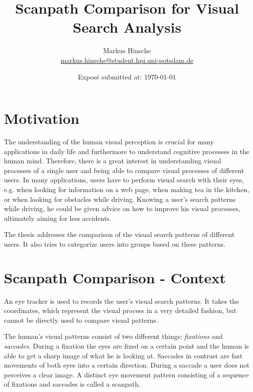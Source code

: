 \documentclass[
        a4paper,     %
        parskip      %
        ]{scrartcl} %
\title{Scanpath Comparison for Visual Search Analysis}
\author{Markus Hinsche\\{\small{\url{markus.hinsche@student.hpi.uni-potsdam.de}}}}
\date{Exposé submitted at: \today}
\begin{document}
  \maketitle    %

\newcommand{\itemsepsize}{-10pt}

  \section{Motivation}

The understanding of the human visual perception is crucial for many applications in daily life and furthermore to understand cognitive processes in the human mind. 
Therefore, there is a great interest in understanding visual processes of a single user and being able to compare visual processes of different users. 
In many applications, users have to perform visual search with their eyes, e.g. when looking for information on a web page, when making tea in the kitchen, or when looking for obstacles while driving. 
Knowing a user's search patterns while driving, he could be given advice on how to improve his visual processes, ultimately aiming for less accidents. 
        
The thesis addresses the comparison of the visual search patterns of different users. It also tries to categorize users into groups based on these patterns.  


  \section{Scanpath Comparison - Context}

An eye tracker is used to records the user's visual search patterns. It takes the coordinates, which represent the visual process in a very detailed fashion, but cannot be directly used to compare visual patterns. 

The human's visual patterns consist of two different things: \emph{fixations} and \emph{saccades}. During a fixation the eyes are fixed on a certain point and the human is able to get a sharp image of what he is looking at. Saccades in contrast are fast movements of both eyes into a certain direction. During a saccade a user does not perceives a clear image. %
A distinct eye movement pattern consisting of a sequence of fixations and saccades is called a scanpath. %
  
\end{document}
